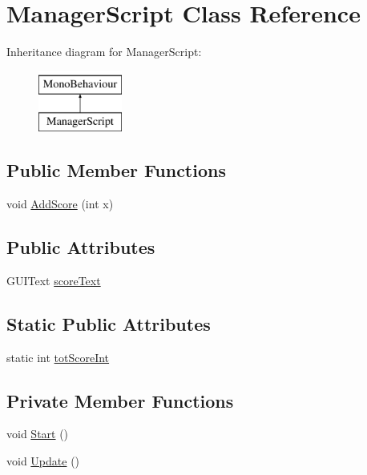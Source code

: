 \hypertarget{class_manager_script}{}\section{Manager\+Script Class Reference}
\label{class_manager_script}
Inheritance diagram for Manager\+Script\+:\begin{figure}[H]
\begin{center}
\leavevmode
\includegraphics[height=2.000000cm]{class_manager_script}
\end{center}
\end{figure}
\subsection*{Public Member Functions}
\begin{DoxyCompactItemize}
\item 
void \hyperlink{class_manager_script_a2f85a1f7589c7bf006be8d7a8370c2a3}{Add\+Score} (int x)
\end{DoxyCompactItemize}
\subsection*{Public Attributes}
\begin{DoxyCompactItemize}
\item 
G\+U\+I\+Text \hyperlink{class_manager_script_acdf95cfdbeb28ea1871de6628fe8eb4f}{score\+Text}
\end{DoxyCompactItemize}
\subsection*{Static Public Attributes}
\begin{DoxyCompactItemize}
\item 
static int \hyperlink{class_manager_script_ae9249ae6a5eee7a36ea33345020f3ea6}{tot\+Score\+Int}
\end{DoxyCompactItemize}
\subsection*{Private Member Functions}
\begin{DoxyCompactItemize}
\item 
void \hyperlink{class_manager_script_a70c096ffb8ab7c8a8bab73bee1992869}{Start} ()
\item 
void \hyperlink{class_manager_script_ab58182b7b824eedad9f8e57f141e7236}{Update} ()
\end{DoxyCompactItemize}
